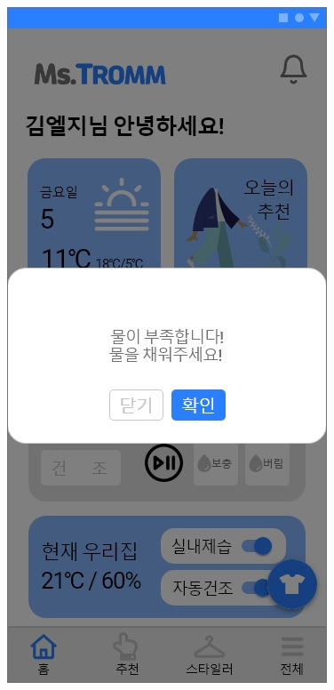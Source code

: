 \documentclass[conference]{IEEEtran}
\begin{document}
\begin{enumerate}
\centerline{\includegraphics[scale=0.18]{제어추천 팝업1.jpg}
}
\end{enumerate}
\end{document}
